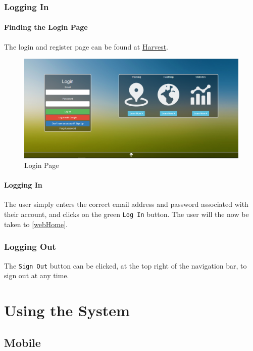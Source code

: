 \documentclass[11pt]{article}
\begin{document}
\subsubsection{Logging In}
\paragraph{Finding the Login Page}The login and register page can be found at \href{https://harvestapp.co.za}{Harvest}.

\begin{figure}
 \centering
 \includegraphics[width=12cm, keepaspectratio]{Images/webLogin.png}
 \caption{Login Page}
 \label{LoginPage}
\end{figure}

\paragraph{Logging In}The user simply enters the correct email address and password associated with their account, and clicks on the green \texttt{Log In} button. The user will the now be taken to \ref{webHome}.

\subsubsection{Logging Out}
\label{webLoggingOut}
The \texttt{Sign Out} button can be clicked, at the top right of the navigation bar, to sign out at any time.

\newpage
\section{Using the System}

\subsection{Mobile}
\end{document}
